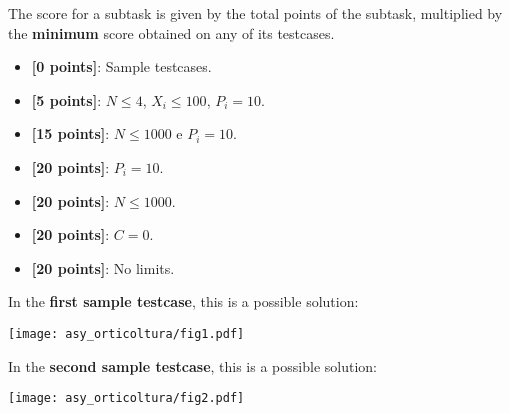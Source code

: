 The score for a subtask is given by the total points of the subtask, multiplied
by the \textbf{minimum} score obtained on any of its testcases.

\begin{itemize}[nolistsep,itemsep=2mm]
  \item \textbf{ [\phantom{0}0 points]}: Sample testcases.
  \item \textbf{ [\phantom{0}5 points]}: $N \leq 4$, $X_i \leq 100$, $P_i = 10$.
  \item \textbf{ [15 points]}: $N \leq 1000$ e $P_i = 10$.
  \item \textbf{ [20 points]}: $P_i = 10$.
  \item \textbf{ [20 points]}: $N \leq 1000$.
  \item \textbf{ [20 points]}: $C = 0$.
  \item \textbf{ [20 points]}: No limits.
\end{itemize}



\Examples

\begin{example}
%
%
\end{example}



\Explanation

In the \textbf{first sample testcase}, this is a possible solution: \\[-22pt]
%
\begin{center}
\texttt{[image: asy\_orticoltura/fig1.pdf]}
\end{center}

In the \textbf{second sample testcase}, this is a possible solution:
%
\begin{center}
\texttt{[image: asy\_orticoltura/fig2.pdf]}
\end{center}
